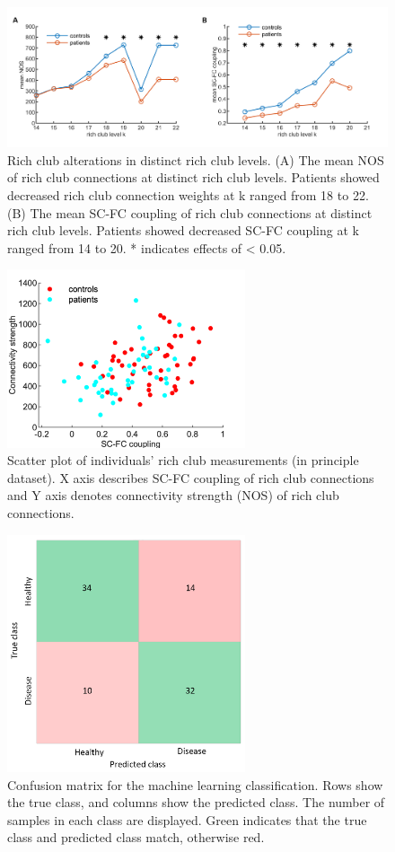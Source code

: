 \begin{refsection}
\begin{figure}[H]
\centering
  \includegraphics[width=\linewidth]{images/rcsczFigS2.png}
  \caption{\small Rich club alterations in distinct rich club levels. (A) The mean NOS of rich club connections at distinct rich club levels. Patients showed decreased rich club connection weights at k ranged from 18 to 22. (B) The mean SC-FC coupling of rich club connections at distinct rich club levels. Patients showed decreased SC-FC coupling at k ranged from 14 to 20. * indicates effects of \pval < 0.05.
}
  \label{figureS2:range}
\end{figure}

\begin{figure}[H]
\centering
  \includegraphics[width=7cm]{images/rcsczFigS3.png}
  \caption{\small Scatter plot of individuals' rich club measurements (in principle dataset). X axis describes SC-FC coupling of rich club connections and Y axis denotes connectivity strength (NOS) of rich club connections.
}
  \label{figureS3:scatter_scfc_nos}
\end{figure}

\begin{figure}[H]
\centering
  \includegraphics[width=7cm]{images/rcsczFigS4.png}
  \caption{\small Confusion matrix for the machine learning classification. Rows show the true class, and columns show the predicted class. The number of samples in each class are displayed. Green indicates that the true class and predicted class match, otherwise red.
}
\label{figureS4:confusionmatrix}
\end{figure}


\end{refsection}


